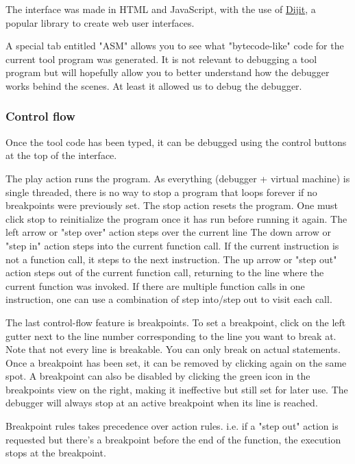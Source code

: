 The interface was made in HTML and JavaScript, with the use of \href{http://dojotoolkit.org/reference-guide/1.10/dijit/}{Dijit}, a popular library to create web user interfaces.

A special tab entitled "ASM" allows you to see what "bytecode-like" code for the current tool program was generated. It is not relevant to debugging a tool program but will hopefully allow you to better understand how the debugger works behind the scenes. At least it allowed us to debug the debugger.

\subsubsection{Control flow}

Once the tool code has been typed, it can be debugged using the control buttons at the top of the interface.

The play action runs the program. As everything (debugger + virtual machine) is single threaded, there is no way to stop a program that loops forever if no breakpoints were previously set.
The stop action resets the program. One must click stop to reinitialize the program once it has run before running it again.
The left arrow or "step over" action steps over the current line
The down arrow or "step in" action steps into the current function call. If the current instruction is not a function call, it steps to the next instruction.
The up arrow or "step out" action steps out of the current function call, returning to the line where the current function was invoked.
If there are multiple function calls in one instruction, one can use a combination of step into/step out to visit each call.

The last control-flow feature is breakpoints. To set a breakpoint, click on the left gutter next to the line number corresponding to the line you want to break at. Note that not every line is breakable. You can only break on actual statements. Once a breakpoint has been set, it can be removed by clicking again on the same spot. A breakpoint can also be disabled by clicking the green icon in the breakpoints view on the right, making it ineffective but still set for later use. The debugger will always stop at an active breakpoint when its line is reached.

Breakpoint rules takes precedence over action rules. i.e. if a "step out" action is requested but there's a breakpoint before the end of the function, the execution stops at the breakpoint.
